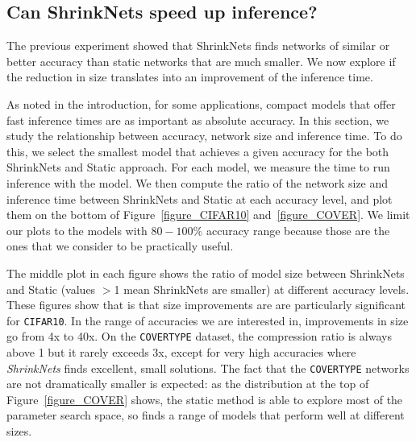 \subsection{Can ShrinkNets speed up inference?}

The previous experiment showed that ShrinkNets finds networks of similar or better accuracy
than static networks that are much smaller. We now explore if the reduction in size
translates into an improvement of the inference time.


As noted in the introduction, for some applications, compact models that offer fast inference times
are as important as absolute accuracy. 
In this section, we study the relationship between accuracy, network size and inference time.
To do this, we select the smallest model 
that achieves a given accuracy for the both ShrinkNets and Static approach.
For each model, we measure the time to run inference with the model.  
We then compute the ratio of the network size and inference time
between ShrinkNets and Static at each accuracy level, and plot them on the bottom of 
 Figure~\ref{figure_CIFAR10} 
 and~\ref{figure_COVER}.
We limit our plots to the models with $80-100\%$
accuracy range because those are the ones that we consider to be practically useful.

 The middle plot in each figure shows the ratio of model size between ShrinkNets and Static (values $>$1 mean ShrinkNets are smaller) at different accuracy levels.  These figures show that is that size improvements are are particularly significant
for  \texttt{CIFAR10}. In the range of accuracies we are interested in,
improvements in size go from 4x to 40x. On the \texttt{COVERTYPE} dataset,
 the compression ratio is always above 1 but it rarely exceeds 3x, except for
very high accuracies where \textit{ShrinkNets} finds excellent, small
solutions.  The fact that the  \texttt{COVERTYPE} networks are not dramatically 
smaller is expected:  as the distribution at the top of Figure~\ref{figure_COVER} shows,
the static method is able to explore most of the parameter search space, so finds a range
of models that perform well at different sizes.

